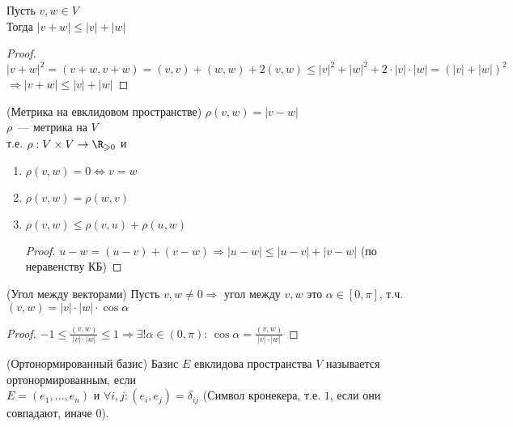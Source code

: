 \follow Пусть $v, w \in V$ \\
Тогда $|v + w| \leqslant |v| + |w|$
\begin{proof}
\emptyln
$|v + w|^2 = (v + w, v + w) = (v, v) + (w, w) + 2(v, w) \leqslant |v|^2 + |w|^2 + 2 \cdot |v| \cdot |w| = (|v| + |w|)^2$ \\
$\Longrightarrow |v + w| \leqslant |v| + |w|$
\end{proof}

\begin{conj}(Метрика на евклидовом пространстве)
    $\rho(v, w) = |v - w|$ \\
    $\rho$~--- метрика на $V$ \\
    т.е. $\rho: V \times V \to \R_{\geqslant 0}$ и
    \begin{enumerate}
        \item $\rho(v, w) = 0 \Longleftrightarrow v = w$
        \item $\rho(v, w) = \rho(w, v)$
        \item $\rho(v, w) \leqslant \rho(v, u) + \rho(u, w)$ \\
        \begin{proof}
            $u - w = (u - v) + (v - w) \Longrightarrow |u - w| \leqslant |u - v| + |v - w|$ (по неравенству КБ)
        \end{proof}
    \end{enumerate}
\end{conj}

\begin{conj}(Угол между векторами)
    Пусть $v, w \neq 0 \Longrightarrow$ угол между $v, w$ это $\alpha \in [0, \pi]$, т.ч. \\
    $(v, w) = |v| \cdot |w| \cdot \cos{\alpha}$

    \begin{proof}
    $-1 \leqslant \frac{(v, w)}{|v| \cdot |w|} \leqslant 1 \Longrightarrow \exists ! \alpha \in (0, \pi): \, \cos{\alpha} = \frac{(v, w)}{|v| \cdot |w|}$
    \end{proof}
\end{conj}

\begin{conj}(Ортонормированный базис)
    Базис $E$ евклидова пространства $V$ называется ортонормированным, если \\
    $E = (e_1, \dots, e_n)$ и $\forall i, j: (e_i, e_j) = \delta_{ij}$ (Символ кронекера, т.е. $1$, если они совпадают, иначе $0$).
\end{conj}

